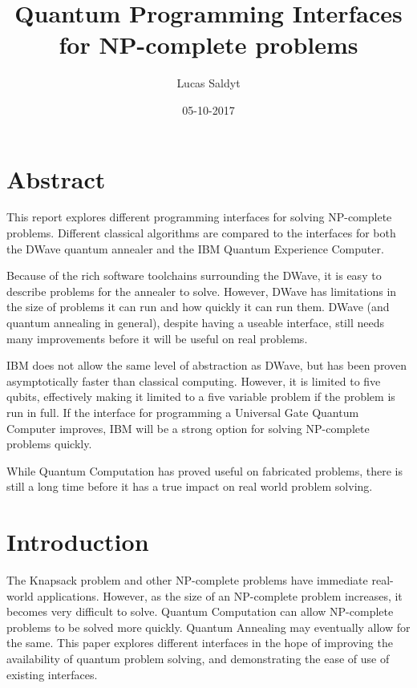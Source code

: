 \documentclass{article}
\title{Quantum Programming Interfaces for NP-complete problems}
\date{05-10-2017}
\author{Lucas Saldyt}
\begin{document}
\maketitle
{}
\newpage
\tableofcontents
\newpage
{}

\section{Abstract}

This report explores different programming interfaces for solving NP-complete problems.
Different classical algorithms are compared to the interfaces for both the DWave quantum annealer and the IBM Quantum Experience Computer.

Because of the rich software toolchains surrounding the DWave, it is easy to describe problems for the annealer to solve.
However, DWave has limitations in the size of problems it can run and how quickly it can run them.
DWave (and quantum annealing in general), despite having a useable interface, still needs many improvements before it will be useful on real problems.

IBM does not allow the same level of abstraction as DWave, but has been proven asymptotically faster than classical computing.
However, it is limited to five qubits, effectively making it limited to a five variable problem if the problem is run in full.
If the interface for programming a Universal Gate Quantum Computer improves, IBM will be a strong option for solving NP-complete problems quickly.

While Quantum Computation has proved useful on fabricated problems, there is still a long time before it has a true impact on real world problem solving.

\section{Introduction}

The Knapsack problem and other NP-complete problems have immediate real-world applications. 
However, as the size of an NP-complete problem increases, it becomes very difficult to solve.
Quantum Computation can allow NP-complete problems to be solved more quickly.
Quantum Annealing may eventually allow for the same.
This paper explores different interfaces in the hope of improving the availability of quantum problem solving, and demonstrating the ease of use of existing interfaces.
\newpage
\end{document}
